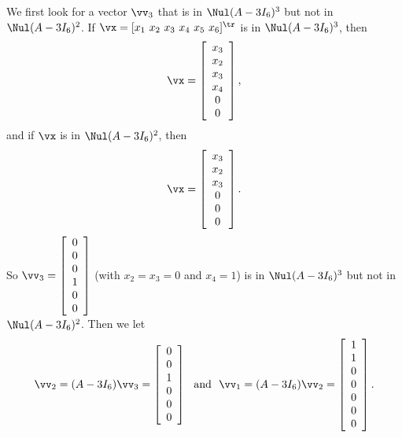 \ActivitySolution
\ba
\item  We first look for a vector $\vv_3$ that is in $\Nul (A-3I_6)^3$ but not in $\Nul (A-3I_6)^2$. If $\vx = [x_1 \ x_2 \ x_3 \ x_4 \ x_5 \ x_6]^{\tr}$ is in $\Nul (A-3I_6)^3$, then 
\[\vx = \left[ \begin{array}{c} x_3 \\ x_2 \\ x_3 \\ x_4 \\ 0 \\ 0 \end{array} \right],\]
and if $\vx$ is in $\Nul (A-3I_6)^2$, then 
\[\vx = \left[ \begin{array}{c} x_3 \\ x_2 \\ x_3 \\ 0 \\ 0 \\ 0 \end{array} \right].\]
So $\vv_3 = \left[ \begin{array}{c} 0 \\ 0 \\ 0 \\ 1 \\ 0 \\ 0\end{array} \right]$ (with $x_2 = x_3=0$ and $x_4=1$) is in $\Nul (A-3I_6)^3$ but not in $\Nul (A-3I_6)^2$. Then we let 
\[\vv_2 = (A-3I_6)\vv_3 = \left[ \begin{array}{c} 0 \\ 0 \\ 1 \\ 0 \\ 0 \\ 0 \end{array} \right] \  \text{ and } \ \vv_1 = (A-3I_6)\vv_2 = \left[ \begin{array}{c} 1 \\ 1 \\ 0 \\ 0 \\ 0 \\ 0 \\ 0 \end{array} \right].\] 

